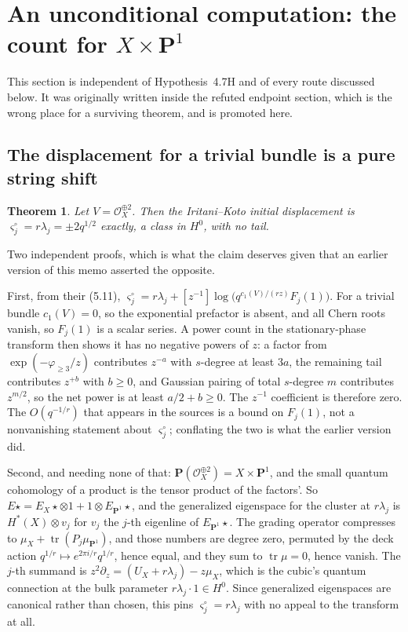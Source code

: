 \documentclass[11pt]{article}
\newtheorem{theorem}{Theorem}
\theoremstyle{definition}
\theoremstyle{remark}
\newcommand{\PP}{\mathbf P}
\begin{document}
\section{An unconditional computation: the count for $X\times\PP^1$}
\label{sec:xp1-unconditional}

This section is independent of Hypothesis~4.7H and of every route discussed
below.  It was originally written inside the refuted endpoint section, which
is the wrong place for a surviving theorem, and is promoted here.

\subsection*{The displacement for a trivial bundle is a pure string shift}

\begin{theorem}
\label{thm:trivial-displacement}
Let $V=\mathcal O_X^{\oplus2}$. Then the Iritani--Koto initial displacement is
$\varsigma_j^\circ=r\lambda_j=\pm2q^{1/2}$ exactly, a class in $H^0$, with no
tail.
\end{theorem}

Two independent proofs, which is what the claim deserves given that an earlier
version of this memo asserted the opposite.

First, from their (5.11), $\varsigma_j^\circ=r\lambda_j
+[z^{-1}]\log\bigl(q^{c_1(V)/(rz)}F_j(1)\bigr)$. For a trivial bundle
$c_1(V)=0$, so the exponential prefactor is absent, and all Chern roots vanish, so
$F_j(1)$ is a scalar series. A power count in the stationary-phase transform then
shows it has no negative powers of $z$: a factor from $\exp(-\varphi_{\ge3}/z)$
contributes $z^{-a}$ with $s$-degree at least $3a$, the remaining tail contributes
$z^{+b}$ with $b\ge0$, and Gaussian pairing of total $s$-degree $m$ contributes
$z^{m/2}$, so the net power is at least $a/2+b\ge0$. The $z^{-1}$ coefficient is
therefore zero. The $O(q^{-1/r})$ that appears in the sources is a bound on
$F_j(1)$, not a nonvanishing statement about $\varsigma_j^\circ$; conflating the
two is what the earlier version did.

Second, and needing none of that: $\PP(\mathcal O_X^{\oplus2})=X\times\PP^1$, and
the small quantum cohomology of a product is the tensor product of the factors'.
So $E\star=E_X\star\otimes1+1\otimes E_{\PP^1}\star$, and the generalized
eigenspace for the cluster at $r\lambda_j$ is $H^*(X)\otimes v_j$ for $v_j$ the
$j$-th eigenline of $E_{\PP^1}\star$. The grading operator compresses to
$\mu_X+\operatorname{tr}(P_j\mu_{\PP^1})$, and those numbers are degree zero,
permuted by the deck action $q^{1/r}\mapsto e^{2\pi i/r}q^{1/r}$, hence equal, and
they sum to $\operatorname{tr}\mu=0$, hence vanish. The $j$-th summand is
$z^2\partial_z=(U_X+r\lambda_j)-z\mu_X$, which is the cubic's quantum connection
at the bulk parameter $r\lambda_j\cdot1\in H^0$. Since generalized eigenspaces are
canonical rather than chosen, this pins $\varsigma_j^\circ=r\lambda_j$ with no
appeal to the transform at all.
\end{document}
